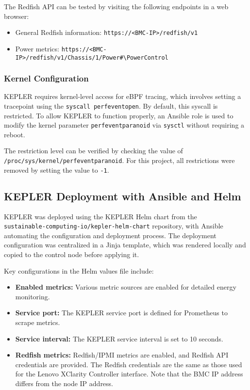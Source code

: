 The Redfish API can be tested by visiting the following endpoints in a web browser:
\begin{itemize}
    \item General Redfish information: \texttt{https://<BMC-IP>/redfish/v1}
    \item Power metrics: \texttt{https://<BMC-IP>/redfish/v1/Chassis/1/Power\#\textbackslash{}PowerControl}
\end{itemize}

\subsubsection{Kernel Configuration}

KEPLER requires kernel-level access for eBPF tracing, which involves setting a tracepoint using the \texttt{syscall perf\textunderscore event\textunderscore open}. By default, this syscall is restricted. To allow KEPLER to function properly, an Ansible role is used to modify the kernel parameter \texttt{perf\textunderscore event\textunderscore paranoid} via \texttt{sysctl} without requiring a reboot.

The restriction level can be verified by checking the value of \texttt{/proc/sys/kernel/perf\textunderscore event\textunderscore paranoid}. For this project, all restrictions were removed by setting the value to \texttt{-1}.

\subsection{KEPLER Deployment with Ansible and Helm}

KEPLER was deployed using the KEPLER Helm chart\parencite{kepler_helm_chart} from the\\\texttt{sustainable-computing-io/kepler-helm-chart} repository, with Ansible automating the configuration and deployment process. The deployment configuration was centralized in a Jinja template, which was rendered locally and copied to the control node before applying it.

Key configurations in the Helm values file include:
\begin{itemize}
    \item \textbf{Enabled metrics:} Various metric sources are enabled for detailed energy monitoring.
    \item \textbf{Service port:} The KEPLER service port is defined for Prometheus to scrape metrics.
    \item \textbf{Service interval:} The KEPLER service interval is set to 10 seconds.
    \item \textbf{Redfish metrics:} Redfish/IPMI metrics are enabled, and Redfish API credentials are provided. The Redfish credentials are the same as those used for the Lenovo XClarity Controller interface. Note that the BMC IP address differs from the node IP address.
\end{itemize}


